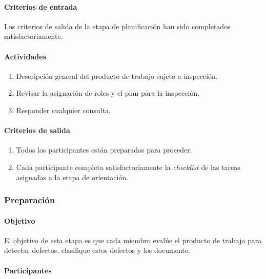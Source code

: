 \paragraph{Criterios de entrada\\}

Los criterios de salida de la etapa de planificación han sido completados satisfactoriamente.

\paragraph{Actividades}

\begin{enumerate}
	\item 
		Descripción general del producto de trabajo sujeto a inspección.
	\item
		Revisar la asignación de roles y el plan para la inspección.
	\item
		Responder cualquier consulta.
\end{enumerate}

\paragraph{Criterios de salida}

\begin{enumerate}
	\item 
		Todos los participantes están preparados para proceder.
	\item 
		Cada participante completa satisfactoriamente la \textit{checklist} de las tareas asignadas a la etapa de orientación.
\end{enumerate}

\subsubsection{Preparación}

\paragraph{Objetivo\\}

El objetivo de esta etapa es que cada miembro evalúe el producto de trabajo para detectar defectos, clasifique estos defectos y los documente. 

\paragraph{Participantes\\}

